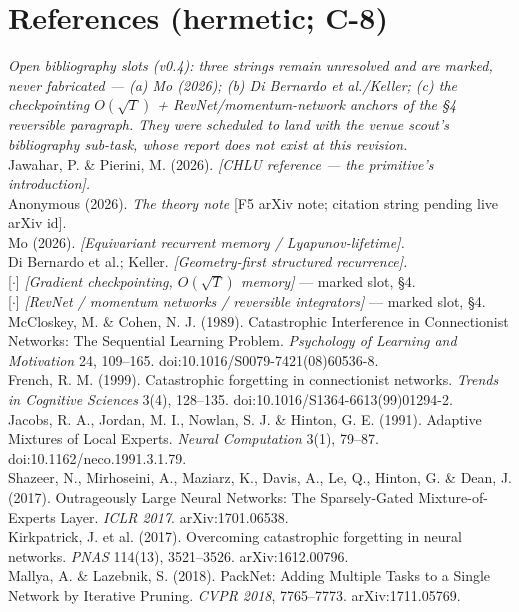 \documentclass[11pt]{article}
\begin{document}
\section*{References (hermetic; C-8)}
\small\raggedright
\emph{Open bibliography slots (v0.4): three strings remain unresolved and are marked, never fabricated --- (a) Mo (2026); (b) Di Bernardo et al./Keller; (c) the checkpointing $O(\sqrt T)$ + RevNet/momentum-network anchors of the \S4 reversible paragraph. They were scheduled to land with the venue scout's bibliography sub-task, whose report does not exist at this revision.}\\[4pt]
Jawahar, P. \& Pierini, M. (2026). \emph{[CHLU reference --- the primitive's introduction].}\\
Anonymous (2026). \emph{The theory note} [F5 arXiv note; citation string pending live arXiv id].\\
Mo (2026). \emph{[Equivariant recurrent memory / Lyapunov-lifetime].}\\
Di Bernardo et al.; Keller. \emph{[Geometry-first structured recurrence].}\\
{}[$\cdot$] \emph{[Gradient checkpointing, $O(\sqrt T)$ memory]} --- marked slot, \S4.\\
{}[$\cdot$] \emph{[RevNet / momentum networks / reversible integrators]} --- marked slot, \S4.\\
McCloskey, M. \& Cohen, N. J. (1989). Catastrophic Interference in Connectionist Networks: The Sequential Learning Problem. \emph{Psychology of Learning and Motivation} 24, 109--165. doi:10.1016/S0079-7421(08)60536-8.\\
French, R. M. (1999). Catastrophic forgetting in connectionist networks. \emph{Trends in Cognitive Sciences} 3(4), 128--135. doi:10.1016/S1364-6613(99)01294-2.\\
Jacobs, R. A., Jordan, M. I., Nowlan, S. J. \& Hinton, G. E. (1991). Adaptive Mixtures of Local Experts. \emph{Neural Computation} 3(1), 79--87. doi:10.1162/neco.1991.3.1.79.\\
Shazeer, N., Mirhoseini, A., Maziarz, K., Davis, A., Le, Q., Hinton, G. \& Dean, J. (2017). Outrageously Large Neural Networks: The Sparsely-Gated Mixture-of-Experts Layer. \emph{ICLR 2017}. arXiv:1701.06538.\\
Kirkpatrick, J. et al. (2017). Overcoming catastrophic forgetting in neural networks. \emph{PNAS} 114(13), 3521--3526. arXiv:1612.00796.\\
Mallya, A. \& Lazebnik, S. (2018). PackNet: Adding Multiple Tasks to a Single Network by Iterative Pruning. \emph{CVPR 2018}, 7765--7773. arXiv:1711.05769.\\
\end{document}
